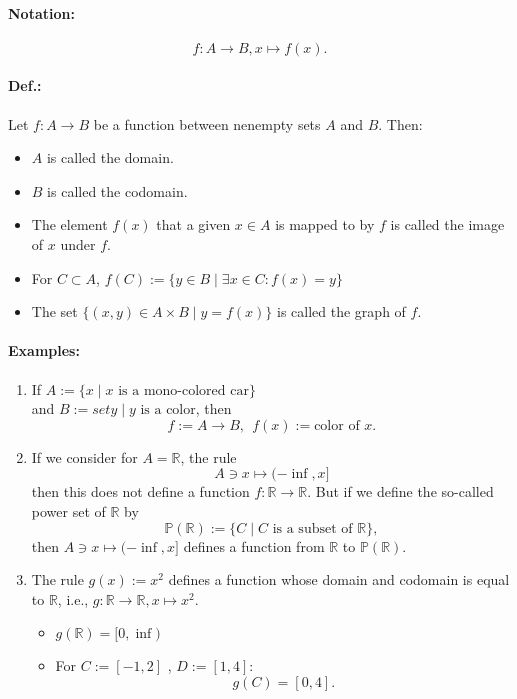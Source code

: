 \documentclass[twocolumn]{article}
\begin{document}
		\paragraph{Notation:}
			\[
			f:A\to B,x\mapsto f(x)
			.\] 
		
		\paragraph{Def.:}
			Let $f:A\to B$ be a function between nenempty sets $A$ and $B$. Then:
			\begin{itemize}%
			\renewcommand{\labelitemi}{$\rightarrow$}
			\item $A$ is called the domain.
			\item $B$ is called the codomain.
			\item The element $f(x)$ that a given $x\in A$ is mapped to by $f$ 
				is called the image of $x$ under $f$.
			\item For $C\subset A$, $f(C):=\{y\in B\mid \exists x\in C:f(x)=y\}$ 
			\item The set $\{(x,y)\in A\times B\mid y=f(x)\}$ is called the graph
				of $f$. 
			\end{itemize}
		\paragraph{Examples:}
			\begin{enumerate}
			\item If $A:=\{x\mid x\mbox{ is a mono-colored car}\}$ \\
				and $B:=set y\mid y\mbox{ is a color}$, then 
				\[
				f:=A\to B,~~f(x):=\mbox{color of }x
				.\] 
			\item If we consider for $A=\mathbb R$, the rule
				\[
					A\ni x\mapsto(-\inf,x]
				\]
				then this does not define a function 
				$f:\mathbb R\to\mathbb R $. But if we define the so-called
				power set of $\mathbb R $ by
				\[
				\mathbb P(\mathbb R ):=\{C\mid C\mbox{ is a subset of }
				\mathbb R \}
				,\]
				then $A\ni x\mapsto(-\inf,x]$ defines a function from 
				$\mathbb R $ to $\mathbb P(\mathbb R)$.
			\item The rule $g(x):=x^2$ defines a function whose domain and codomain
				is equal to $\mathbb R $, i.e., $g:\mathbb R\to\mathbb R,x
				\mapsto x^2$.
				\begin{itemize}%
				\renewcommand{\labelitemi}{$\rightarrow$}
				\item $g(\mathbb R )=[0,\inf)$ 
				\item For $C:=[-1,2]$ , $D:=[1,4]$:
					\[
						g(C)=[0,4]
					.\] 
				\end{itemize}
			\end{enumerate}
	
\end{document}
